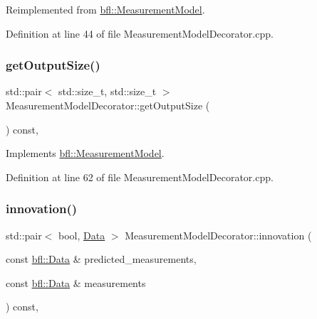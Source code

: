Reimplemented from \mbox{\hyperlink{classbfl_1_1MeasurementModel_af25f42076b69e0c6cab47d36d796536f}{bfl\+::\+Measurement\+Model}}.



Definition at line 44 of file Measurement\+Model\+Decorator.\+cpp.

\mbox{\label{classbfl_1_1MeasurementModelDecorator_a9522d1549c62f55a59401f6fa53421e8}} 
\subsubsection{\texorpdfstring{get\+Output\+Size()}{getOutputSize()}}
{\footnotesize\ttfamily std\+::pair$<$ std\+::size\+\_\+t, std\+::size\+\_\+t $>$ Measurement\+Model\+Decorator\+::get\+Output\+Size (\begin{DoxyParamCaption}{ }\end{DoxyParamCaption}) const\hspace{0.3cm}{\ttfamily [override]}, {\ttfamily [virtual]}}



Implements \mbox{\hyperlink{classbfl_1_1MeasurementModel_a6cca2022b576c9dbb61e73b83a10c6ee}{bfl\+::\+Measurement\+Model}}.



Definition at line 62 of file Measurement\+Model\+Decorator.\+cpp.

\mbox{\label{classbfl_1_1MeasurementModelDecorator_af2c4f2057a721f77d02fc54498136d47}} 
\subsubsection{\texorpdfstring{innovation()}{innovation()}}
{\footnotesize\ttfamily std\+::pair$<$ bool, \mbox{\hyperlink{namespacebfl_af6b103c6821db1b54452f776fdd9dd02}{Data}} $>$ Measurement\+Model\+Decorator\+::innovation (\begin{DoxyParamCaption}\item[{const \mbox{\hyperlink{namespacebfl_af6b103c6821db1b54452f776fdd9dd02}{bfl\+::\+Data}} \&}]{predicted\+\_\+measurements,  }\item[{const \mbox{\hyperlink{namespacebfl_af6b103c6821db1b54452f776fdd9dd02}{bfl\+::\+Data}} \&}]{measurements }\end{DoxyParamCaption}) const\hspace{0.3cm}{\ttfamily [override]}, {\ttfamily [virtual]}}




